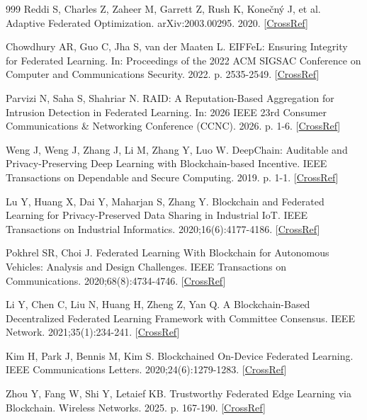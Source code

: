 \documentclass[cmc,article,submit,moreauthors,pdftex]{Definitions/tsp}
\begin{document}
\begin{thebibliography}{999}
Reddi S, Charles Z, Zaheer M, Garrett Z, Rush K, Konečný J, et al. Adaptive Federated Optimization. arXiv:2003.00295. 2020. [\href{https://doi.org/10.48550/arXiv.2003.00295}{CrossRef}]

Chowdhury AR, Guo C, Jha S, van der Maaten L. EIFFeL: Ensuring Integrity for Federated Learning. In: Proceedings of the 2022 ACM SIGSAC Conference on Computer and Communications Security. 2022. p. 2535-2549. [\href{https://doi.org/10.1145/3548606.3560611}{CrossRef}]

Parvizi N, Saha S, Shahriar N. RAID: A Reputation-Based Aggregation for Intrusion Detection in Federated Learning. In: 2026 IEEE 23rd Consumer Communications \& Networking Conference (CCNC). 2026. p. 1-6. [\href{https://doi.org/10.1109/ccnc65079.2026.11366587}{CrossRef}]

Weng J, Weng J, Zhang J, Li M, Zhang Y, Luo W. DeepChain: Auditable and Privacy-Preserving Deep Learning with Blockchain-based Incentive. IEEE Transactions on Dependable and Secure Computing. 2019. p. 1-1. [\href{https://doi.org/10.1109/tdsc.2019.2952332}{CrossRef}]

Lu Y, Huang X, Dai Y, Maharjan S, Zhang Y. Blockchain and Federated Learning for Privacy-Preserved Data Sharing in Industrial IoT. IEEE Transactions on Industrial Informatics. 2020;16(6):4177-4186. [\href{https://doi.org/10.1109/tii.2019.2942190}{CrossRef}]

Pokhrel SR, Choi J. Federated Learning With Blockchain for Autonomous Vehicles: Analysis and Design Challenges. IEEE Transactions on Communications. 2020;68(8):4734-4746. [\href{https://doi.org/10.1109/tcomm.2020.2990686}{CrossRef}]

Li Y, Chen C, Liu N, Huang H, Zheng Z, Yan Q. A Blockchain-Based Decentralized Federated Learning Framework with Committee Consensus. IEEE Network. 2021;35(1):234-241. [\href{https://doi.org/10.1109/mnet.011.2000263}{CrossRef}]

Kim H, Park J, Bennis M, Kim S. Blockchained On-Device Federated Learning. IEEE Communications Letters. 2020;24(6):1279-1283. [\href{https://doi.org/10.1109/lcomm.2019.2921755}{CrossRef}]

Zhou Y, Fang W, Shi Y, Letaief KB. Trustworthy Federated Edge Learning via Blockchain. Wireless Networks. 2025. p. 167-190. [\href{https://doi.org/10.1007/978-3-031-96649-1_9}{CrossRef}]


\end{thebibliography}
\end{document}
